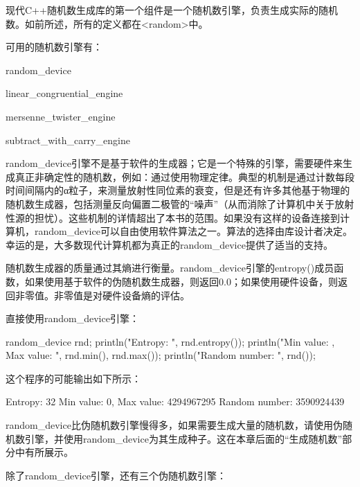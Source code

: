 现代C++随机数生成库的第一个组件是一个随机数引擎，负责生成实际的随机数。如前所述，所有的定义都在<random>中。

可用的随机数引擎有：

\begin{cpp}
random_device
\end{cpp}

\begin{cpp}
linear_congruential_engine
\end{cpp}

\begin{cpp}
mersenne_twister_engine
\end{cpp}

\begin{cpp}
subtract_with_carry_engine
\end{cpp}

random\_device引擎不是基于软件的生成器；它是一个特殊的引擎，需要硬件来生成真正非确定性的随机数，例如：通过使用物理定律。典型的机制是通过计数每段时间间隔内的α粒子，来测量放射性同位素的衰变，但是还有许多其他基于物理的随机数生成器，包括测量反向偏置二极管的“噪声”（从而消除了计算机中关于放射性源的担忧）。这些机制的详情超出了本书的范围。如果没有这样的设备连接到计算机，random\_device可以自由使用软件算法之一。算法的选择由库设计者决定。幸运的是，大多数现代计算机都为真正的random\_device提供了适当的支持。

随机数生成器的质量通过其熵进行衡量。random\_device引擎的entropy()成员函数，如果使用基于软件的伪随机数生成器，则返回0.0；如果使用硬件设备，则返回非零值。非零值是对硬件设备熵的评估。

直接使用random\_device引擎：

\begin{cpp}
random_device rnd;
println("Entropy: {}", rnd.entropy());
println("Min value: {}, Max value: {}", rnd.min(), rnd.max());
println("Random number: {}", rnd());
\end{cpp}

这个程序的可能输出如下所示：

\begin{shell}
Entropy: 32
Min value: 0, Max value: 4294967295
Random number: 3590924439
\end{shell}

random\_device比伪随机数引擎慢得多，如果需要生成大量的随机数，请使用伪随机数引擎，并使用random\_device为其生成种子。这在本章后面的“生成随机数”部分中有所展示。

除了random\_device引擎，还有三个伪随机数引擎：

